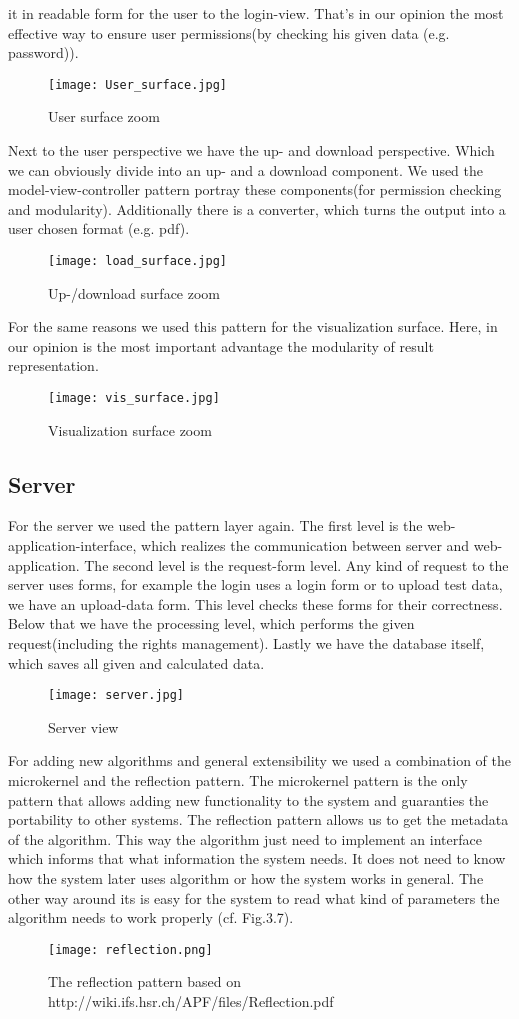 \documentclass{book}
\begin{document}
it in readable form for the user to the login-view. That's in our opinion the most effective way to ensure user permissions(by checking his given data (e.g. password)).
\begin{figure}[H]
\centering
\texttt{[image: User\_surface.jpg]}
\caption{User surface zoom}
\label{Fig. 4}
\end{figure}
Next to the user perspective we have the up- and download perspective. Which we can obviously divide into an up- and a download component. We used the model-view-controller pattern portray these components(for permission checking and modularity). Additionally there is a converter, which turns the output into a user chosen format (e.g. pdf).
\begin{figure}[H]
\centering
\texttt{[image: load\_surface.jpg]}
\caption{Up-/download surface zoom}
\label{Fig. 5}
\end{figure}
For the same reasons we used this pattern for the visualization surface. Here, in our opinion is the most important advantage the modularity of result representation.
\begin{figure}[H]
\centering
\texttt{[image: vis\_surface.jpg]}
\caption{Visualization surface zoom}
\label{Fig. 6}
\end{figure}
\subsection{Server}
For the server we used the pattern layer again. The first level is the web-application-interface, which realizes the communication between server and web-application. The second level is the request-form level. Any kind of request to the server uses forms, for example the login uses a login form or to upload test data, we have an upload-data form. This level checks these forms for their correctness. Below that we have the processing level, which performs the given request(including the rights management). Lastly we have the database itself, which saves all given and calculated data.
\begin{figure}[H]
\centering
\texttt{[image: server.jpg]}
\caption{Server view}
\label{Fig. 7}
\end{figure}
For adding new algorithms and general extensibility we used a combination of the microkernel and the reflection pattern. The microkernel pattern is the only pattern that allows adding new functionality to the system and guaranties the portability to other systems. The reflection pattern allows us to get the metadata of the algorithm.
This way the algorithm just need to implement an interface which informs that what information the system needs. It does not need to know how the system later uses algorithm or how the system works in general. The other way around its is easy for the system to read what kind of parameters the algorithm needs to work properly (cf. Fig.3.7).
\begin{figure}[H]
\centering
\texttt{[image: reflection.png]}
\caption{The reflection pattern based on http://wiki.ifs.hsr.ch/APF/files/Reflection.pdf}
\label{Fig. 8}
\end{figure}
\end{document}
